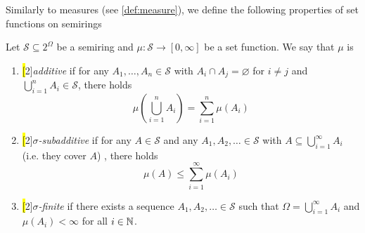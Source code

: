 Similarly to measures (see \autoref{def:measure}), we define the following properties of set functions on semirings
\begin{definition} \label{def:set-function-properties}
Let $\mathcal{S} \subseteq 2^\Omega$ be a semiring and $\mu : \mathcal{S} \to [0,\infty]$ be a set function.
We say that $\mu$ is
\begin{enumerate}[label=(\roman*)]
\item \label{def:set-function-additive}
\hl[2]{\emph{additive}} if for any $A_1, \ldots, A_n \in \mathcal{S}$ with $A_i \cap A_j = \varnothing$ for $i \neq j$ and $\bigcup_{i=1}^n A_i \in \mathcal{S}$, there holds
\[
\mu\left(\bigcup_{i=1}^n A_i\right) = \sum_{i=1}^n \mu(A_i)
\]
\item \label{def:set-function-sigma-subadditive}
\hl[2]{\emph{$\sigma$-subadditive}} if for any $A \in \mathcal{S}$ and any $A_1, A_2, \ldots \in \mathcal{S}$ with $A \subseteq \bigcup_{i=1}^\infty A_i$ 
(i.e. they cover $A$)%
, there holds
\[
\mu(A) \leq \sum_{i=1}^\infty \mu(A_i)
\]
\item \label{def:set-function-sigma-finite}
\hl[2]{\emph{$\sigma$-finite}} if there exists a sequence $A_1, A_2, \ldots \in \mathcal{S}$ such that $\Omega = \bigcup_{i=1}^\infty A_i$ and $\mu(A_i) < \infty$ for all $i \in \mathbb{N}$.
\qedhere
\end{enumerate}
\end{definition}

